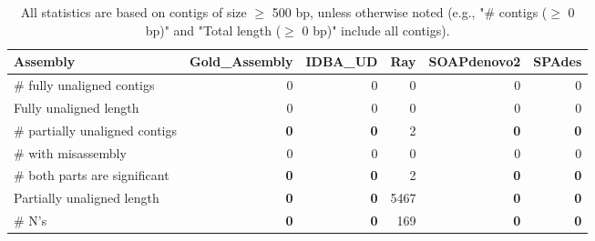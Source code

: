\documentclass[12pt,a4paper]{article}
\begin{document}
\begin{table}[ht]
\begin{center}
\caption{All statistics are based on contigs of size $\geq$ 500 bp, unless otherwise noted (e.g., "\# contigs ($\geq$ 0 bp)" and "Total length ($\geq$ 0 bp)" include all contigs).}
\begin{tabular}{|l*{5}{|r}|}
\hline
Assembly & Gold\_Assembly & IDBA\_UD & Ray & SOAPdenovo2 & SPAdes \\ \hline
\# fully unaligned contigs & 0 & 0 & 0 & 0 & 0 \\ \hline
Fully unaligned length & 0 & 0 & 0 & 0 & 0 \\ \hline
\# partially unaligned contigs & {\bf 0} & {\bf 0} & 2 & {\bf 0} & {\bf 0} \\ \hline
\hspace{5mm}\# with misassembly & 0 & 0 & 0 & 0 & 0 \\ \hline
\hspace{5mm}\# both parts are significant & {\bf 0} & {\bf 0} & 2 & {\bf 0} & {\bf 0} \\ \hline
Partially unaligned length & {\bf 0} & {\bf 0} & 5467 & {\bf 0} & {\bf 0} \\ \hline
\# N's & {\bf 0} & {\bf 0} & 169 & {\bf 0} & {\bf 0} \\ \hline
\end{tabular}
\end{center}
\end{table}
\end{document}
